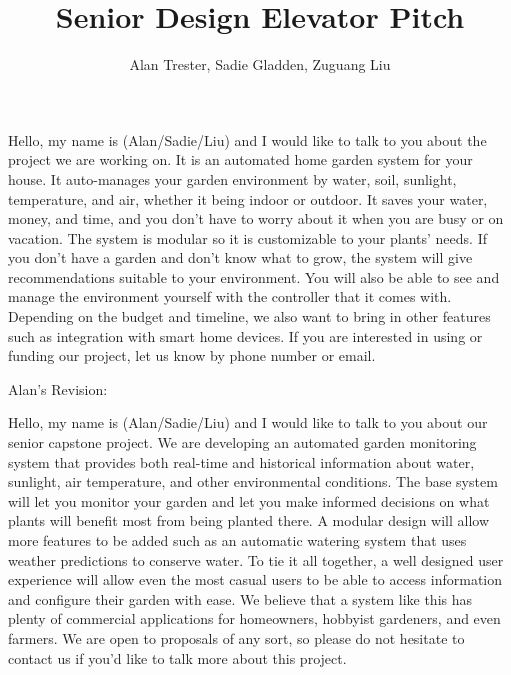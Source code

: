 \documentclass[14pt]{article}
\title{Senior Design Elevator Pitch}
\author{Alan Trester, Sadie Gladden, Zuguang Liu}
\begin{document}
\maketitle

Hello, my name is (Alan/Sadie/Liu) and I would like to talk to you about the project we are working on. It is an automated home garden system for your house. It auto-manages your garden environment by water, soil, sunlight, temperature, and air, whether it being indoor or outdoor. It saves your water, money, and time, and you don't have to worry about it when you are busy or on vacation. The system is modular so it is customizable to your plants' needs. If you don't have a garden and don't know what to grow, the system will give recommendations suitable to your environment. You will also be able to see and manage the environment yourself with the controller that it comes with. Depending on the budget and timeline, we also want to bring in other features such as integration with smart home devices. If you are interested in using or funding our project, let us know by phone number or email.

Alan's Revision:

Hello, my name is (Alan/Sadie/Liu) and I would like to talk to you about our senior capstone project. We are developing an automated garden monitoring system that provides both real-time and historical information about water, sunlight, air temperature, and other environmental conditions. The base system will let you monitor your garden and let you make informed decisions on what plants will benefit most from being planted there. A modular design will allow more features to be added such as an automatic watering system that uses weather predictions to conserve water. To tie it all together, a well designed user experience will allow even the most casual users to be able to access information and configure their garden with ease. We believe that a system like this has plenty of commercial applications for homeowners, hobbyist gardeners, and even farmers. We are open to proposals of any sort, so please do not hesitate to contact us if you'd like to talk more about this project.
\end{document}

